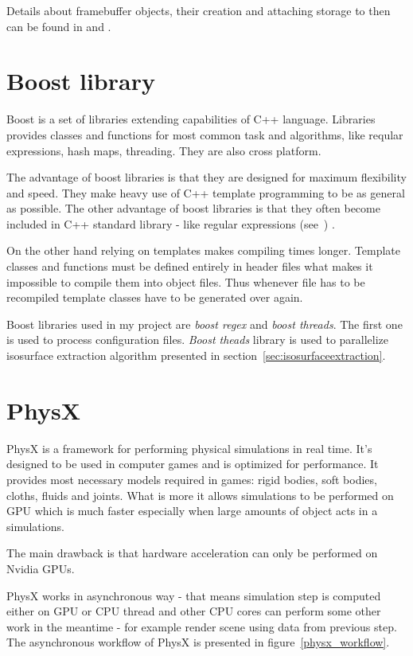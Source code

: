 Details about framebuffer objects, their creation and attaching storage to then can be found in \cite[chapter~8]{OpenGLSuperbible} and \cite[chapter~10]{RedBook}.

\section{Boost library}
Boost is a set of libraries extending capabilities of C++ language. Libraries provides classes and functions for most common task and algorithms, like reqular expressions, hash maps, threading. They are also cross platform. 

The advantage of boost libraries is that they are designed for maximum flexibility and speed. They make heavy use of C++ template programming to be as general as possible. The other advantage of boost libraries is that they often become included in C++ standard library - like regular expressions (see~\cite{CppRef}) . 

On the other hand relying on templates makes compiling times longer. Template classes and functions must be defined entirely in header files what makes it impossible to compile them into object files. Thus whenever file has to be recompiled template classes have to be generated over again.

Boost libraries used in my project are \textit{boost regex} and \textit{boost threads}. The first one is used to process configuration files. \textit{Boost theads} library is used to parallelize isosurface extraction algorithm presented in section~\ref{sec:isosurfaceextraction}.

\section{PhysX}

PhysX is a framework for performing physical simulations in real time. It's designed to be used in computer games and is optimized for performance. It provides most necessary models required in games: rigid bodies, soft bodies, cloths, fluids and joints. What is more it allows simulations to be performed on GPU which is much faster especially when large amounts of object acts in a simulations.

The main drawback is that hardware acceleration can only be performed on Nvidia GPUs. 

PhysX works in asynchronous way - that means simulation step is computed either on GPU or CPU thread and other CPU cores can perform some other work in the meantime - for example render scene using data from previous step. The asynchronous workflow of PhysX is presented in figure~\ref{physx_workflow}.

